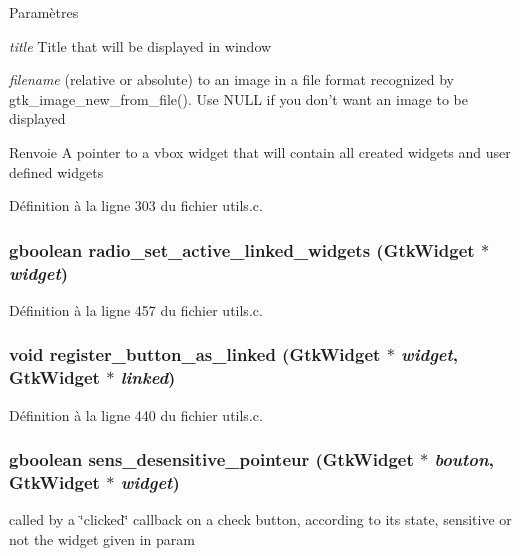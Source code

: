 \begin{DoxyParams}{Paramètres}
\item[{\em title}]Title that will be displayed in window \item[{\em filename}](relative or absolute) to an image in a file format recognized by gtk\_\-image\_\-new\_\-from\_\-file(). Use NULL if you don't want an image to be displayed\end{DoxyParams}
\begin{DoxyReturn}{Renvoie}
A pointer to a vbox widget that will contain all created widgets and user defined widgets 
\end{DoxyReturn}


Définition à la ligne 303 du fichier utils.c.

\subsubsection[{radio\_\-set\_\-active\_\-linked\_\-widgets}]{\setlength{\rightskip}{0pt plus 5cm}gboolean radio\_\-set\_\-active\_\-linked\_\-widgets (GtkWidget $\ast$ {\em widget})}\label{utils_8c_a055ba30be6b646e68d1b47934e392f1e}


Définition à la ligne 457 du fichier utils.c.

\subsubsection[{register\_\-button\_\-as\_\-linked}]{\setlength{\rightskip}{0pt plus 5cm}void register\_\-button\_\-as\_\-linked (GtkWidget $\ast$ {\em widget}, \/  GtkWidget $\ast$ {\em linked})}\label{utils_8c_a84c3531f5b0d92c5099a458bbf5df7cc}


Définition à la ligne 440 du fichier utils.c.

\subsubsection[{sens\_\-desensitive\_\-pointeur}]{\setlength{\rightskip}{0pt plus 5cm}gboolean sens\_\-desensitive\_\-pointeur (GtkWidget $\ast$ {\em bouton}, \/  GtkWidget $\ast$ {\em widget})}\label{utils_8c_ad678079f1b9eb979a0766e9dcbec0fd3}
called by a \char`\"{}clicked\char`\"{} callback on a check button, according to its state, sensitive or not the widget given in param


